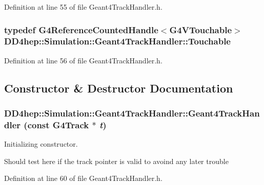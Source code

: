 Definition at line 55 of file Geant4TrackHandler.h.\hypertarget{class_d_d4hep_1_1_simulation_1_1_geant4_track_handler_a7db438397a8ccd838ba7bf5fe1b75bdb}{
\subsubsection[{Touchable}]{\setlength{\rightskip}{0pt plus 5cm}typedef G4ReferenceCountedHandle$<$G4VTouchable$>$ {\bf DD4hep::Simulation::Geant4TrackHandler::Touchable}}}
\label{class_d_d4hep_1_1_simulation_1_1_geant4_track_handler_a7db438397a8ccd838ba7bf5fe1b75bdb}


Definition at line 56 of file Geant4TrackHandler.h.

\subsection{Constructor \& Destructor Documentation}
\hypertarget{class_d_d4hep_1_1_simulation_1_1_geant4_track_handler_a265dee4b9cf7103db1a6ea66941d300a}{
\subsubsection[{Geant4TrackHandler}]{\setlength{\rightskip}{0pt plus 5cm}DD4hep::Simulation::Geant4TrackHandler::Geant4TrackHandler (const G4Track $\ast$ {\em t})}}
\label{class_d_d4hep_1_1_simulation_1_1_geant4_track_handler_a265dee4b9cf7103db1a6ea66941d300a}


Initializing constructor. 

Should test here if the track pointer is valid to avoind any later trouble 

Definition at line 60 of file Geant4TrackHandler.h.

